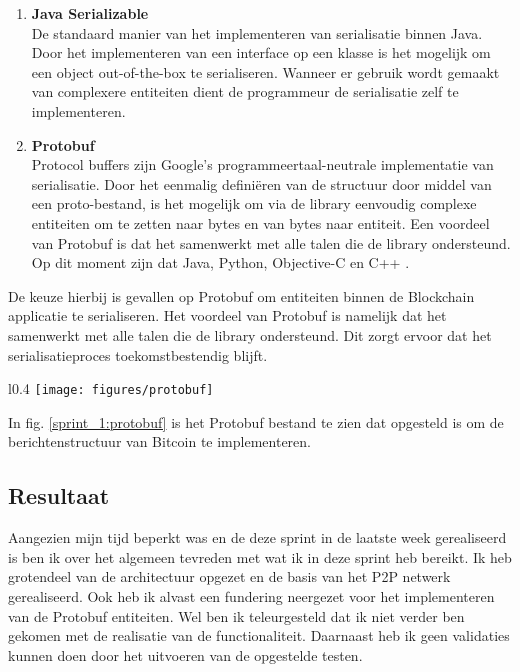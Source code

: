 \begin{enumerate}
  \item \textbf{Java Serializable}
  \\ De standaard manier van het implementeren van serialisatie binnen Java. Door het implementeren van een interface op een klasse is het mogelijk om een object out-of-the-box te serialiseren. Wanneer er gebruik wordt gemaakt van complexere entiteiten dient de programmeur de serialisatie zelf te implementeren.
  \item \textbf{Protobuf}
  \\ Protocol buffers zijn Google's programmeertaal-neutrale implementatie van serialisatie. Door het eenmalig definiëren van de structuur door middel van een proto-bestand, is het mogelijk om via de library eenvoudig complexe entiteiten om te zetten naar bytes en van bytes naar entiteit. Een voordeel van Protobuf is dat het samenwerkt met alle talen die de library ondersteund. Op dit moment zijn dat Java, Python, Objective-C en C++ \citep{protobuf}.
\end{enumerate}

De keuze hierbij is gevallen op Protobuf om entiteiten binnen de Blockchain applicatie te serialiseren. Het voordeel van Protobuf is namelijk dat het samenwerkt met alle talen die de library ondersteund. Dit zorgt ervoor dat het serialisatieproces toekomstbestendig blijft.

\begin{wrapfigure}[16]{l}{0.4\textwidth}
    \texttt{[image: figures/protobuf]}
    \caption[Protobuf]{Opgesteld Protobuf bestand.}
    \label{sprint_1:protobuf}
\end{wrapfigure} 

In fig. \ref{sprint_1:protobuf} is het Protobuf bestand te zien dat opgesteld is om de berichtenstructuur van Bitcoin te implementeren. 

\subsection{Resultaat}

Aangezien mijn tijd beperkt was en de deze sprint in de laatste week gerealiseerd is ben ik over het algemeen tevreden met wat ik in deze sprint heb bereikt. Ik heb grotendeel van de architectuur opgezet en de basis van het \acrshort{P2P} netwerk gerealiseerd. Ook heb ik alvast een fundering neergezet voor het implementeren van de Protobuf entiteiten. Wel ben ik teleurgesteld dat ik niet verder ben gekomen met de realisatie van de functionaliteit. Daarnaast heb ik geen validaties kunnen doen door het uitvoeren van de opgestelde testen. 

